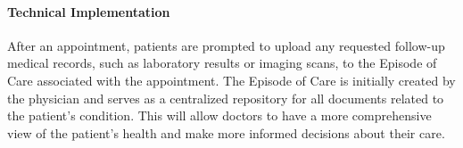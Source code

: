 \paragraph{Technical Implementation}
After an appointment, patients are prompted to upload any requested follow-up medical records, 
such as laboratory results or imaging scans, to the Episode of Care associated with the appointment. 
The Episode of Care is initially created by the physician and serves as a centralized repository for all documents related to the patient's condition. 
This will allow doctors to have a more comprehensive view of the patient's health and make more informed decisions about their care.


% 
% 
